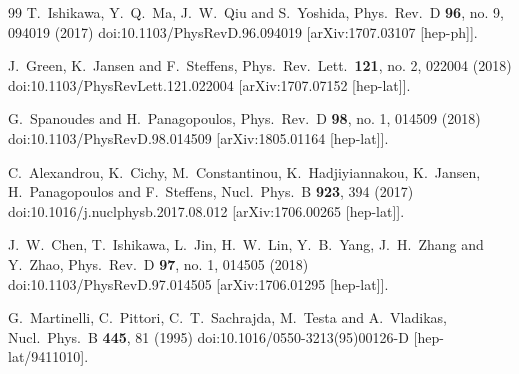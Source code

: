 \begin{thebibliography}{99}
  T.~Ishikawa, Y.~Q.~Ma, J.~W.~Qiu and S.~Yoshida,
  Phys.\ Rev.\ D {\bf 96}, no. 9, 094019 (2017)
  doi:10.1103/PhysRevD.96.094019
  [arXiv:1707.03107 [hep-ph]].


  J.~Green, K.~Jansen and F.~Steffens,
  Phys.\ Rev.\ Lett.\  {\bf 121}, no. 2, 022004 (2018)
  doi:10.1103/PhysRevLett.121.022004
  [arXiv:1707.07152 [hep-lat]].


  G.~Spanoudes and H.~Panagopoulos,
  Phys.\ Rev.\ D {\bf 98}, no. 1, 014509 (2018)
  doi:10.1103/PhysRevD.98.014509
  [arXiv:1805.01164 [hep-lat]].


  C.~Alexandrou, K.~Cichy, M.~Constantinou, K.~Hadjiyiannakou, K.~Jansen, H.~Panagopoulos and F.~Steffens,
  Nucl.\ Phys.\ B {\bf 923}, 394 (2017)
  doi:10.1016/j.nuclphysb.2017.08.012
  [arXiv:1706.00265 [hep-lat]].


  J.~W.~Chen, T.~Ishikawa, L.~Jin, H.~W.~Lin, Y.~B.~Yang, J.~H.~Zhang and Y.~Zhao,
  Phys.\ Rev.\ D {\bf 97}, no. 1, 014505 (2018)
  doi:10.1103/PhysRevD.97.014505
  [arXiv:1706.01295 [hep-lat]].


  G.~Martinelli, C.~Pittori, C.~T.~Sachrajda, M.~Testa and A.~Vladikas,
  Nucl.\ Phys.\ B {\bf 445}, 81 (1995)
  doi:10.1016/0550-3213(95)00126-D
  [hep-lat/9411010].



\end{thebibliography}
